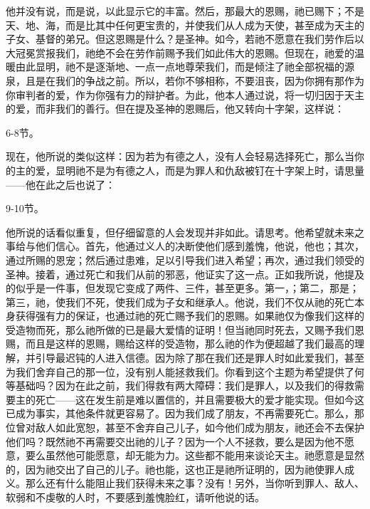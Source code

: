 他并没有说，而是说，以此显示它的丰富。然后，那最大的恩赐，祂已赐下；不是天、地、海，而是比其中任何更宝贵的，并使我们从人成为天使，甚至成为天主的子女、基督的弟兄。但这恩赐是什么？是圣神。如今，若祂不愿意在我们劳作后以大冠冕赏报我们，祂绝不会在劳作前赐予我们如此伟大的恩赐。但现在，祂爱的温暖由此显明，祂不是逐渐地、一点一点地尊荣我们，而是倾注了祂全部祝福的源泉，且是在我们的争战之前。所以，若你不够相称，不要沮丧，因为你拥有那作为你审判者的爱，作为你强有力的辩护者。为此，他本人通过说，将一切归因于天主的爱，而非我们的善行。但在提及圣神的恩赐后，他又转向十字架，这样说：\par

6-8节。\par

现在，他所说的类似这样：因为若为有德之人，没有人会轻易选择死亡，那么当你的主的爱，显明祂不是为有德之人，而是为罪人和仇敌被钉在十字架上时，请思量——他在此之后也说了：\par

9-10节。\par

他所说的话看似重复，但仔细留意的人会发现并非如此。请思考。他希望就未来之事给与他们信心。首先，他通过义人的决断使他们感到羞愧，他说，他也；其次，通过所赐的恩宠；然后通过患难，足以引导我们进入希望；再次，通过我们领受的圣神。接着，通过死亡和我们从前的邪恶，他证实了这一点。正如我所说，他提及的似乎是一件事，但发现它变成了两件、三件，甚至更多。第一，；第二，那是；第三，祂，使我们不死，使我们成为子女和继承人。他说，我们不仅从祂的死亡本身获得强有力的保证，也通过祂的死亡赐予我们的恩赐。如果祂仅为像我们这样的受造物而死，那么祂所做的已是最大爱情的证明！但当祂同时死去，又赐予我们恩赐，而且是这样的恩赐，赐给这样的受造物，那么祂的作为便超越了我们最高的理解，并引导最迟钝的人进入信德。因为除了那在我们还是罪人时如此爱我们，甚至为我们舍弃自己的那一位，没有别人能拯救我们。你看到这个主题为希望提供了何等基础吗？因为在此之前，我们得救有两大障碍：我们是罪人，以及我们的得救需要主的死亡——这在发生前是难以置信的，并且需要极大的爱才能实现。但如今这已成为事实，其他条件就更容易了。因为我们成了朋友，不再需要死亡。那么，那位曾对敌人如此宽恕，甚至不舍弃自己儿子，如今他们成为朋友，祂还会不去保护他们吗？既然祂不再需要交出祂的儿子？因为一个人不拯救，要么是因为他不愿意，要么虽然他可能愿意，却无能为力。这些都不能用来谈论天主。祂愿意是显然的，因为祂交出了自己的儿子。祂也能，这也正是祂所证明的，因为祂使罪人成义。那么还有什么能阻止我们获得未来之事？没有！另外，当你听到罪人、敌人、软弱和不虔敬的人时，不要感到羞愧脸红，请听他说的话。\par


